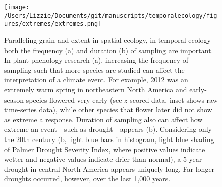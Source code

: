 \documentclass[11pt,a4paper,oneside]{article}
\begin{document}
\newpage
\begin{figure}[h!]
\centering
\noindent \texttt{[image: /Users/Lizzie/Documents/git/manuscripts/temporalecology/figures/extremes/extremes.png]}
\caption{Paralleling grain and extent in spatial ecology, in temporal ecology both the frequency (a) and duration (b) of sampling are important. In plant phenology research (a), increasing the frequency of sampling such that more species are studied can affect the interpretation of a climate event. For example, 2012 was an extremely warm spring in northeastern North America and early-season species flowered very early (see $z$-scored data, inset shows raw time-series data), while other species that flower later did not show as extreme a response. Duration of sampling also can affect how extreme an event---such as drought---appears (b). Considering only the 20th century (b, light blue bars in histogram, light blue shading of Palmer Drought Severity Index, where positive values indicate wetter and negative values indicate drier than normal), a 5-year drought in central North America appears uniquely long. Far longer droughts occurred, however, over the last 1,000 years.}
\end{figure}
\end{document}

